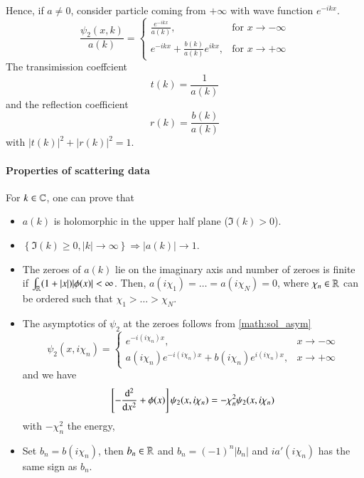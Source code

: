 Hence, if $a\neq 0$, consider particle coming from $+\infty$ with wave function $e^{-ikx}$. 
\begin{equation}
	\frac{\psi_2(x,k)}{a(k)} = 
	\begin{cases}
		\frac{e^{-ikx}}{a(k)}, & \text{for } x \rightarrow - \infty \\
		e^{-ikx} + \frac{b(k)}{a(k)} e^{ikx}, & \text{for } x \rightarrow + \infty
	\end{cases}
	\label{math:sol_asym}
\end{equation}
The transimission coeffcient 
\begin{equation*}
	t(k) = \frac{1}{a(k)}
\end{equation*}
and the reflection coefficient
\begin{equation*}
	r(k) = \frac{b(k)}{a(k)}
\end{equation*}
with $|t(k)|^2 + |r(k)|^2 = 1$.

\paragraph{Properties of scattering data}
For $k \in \mathbb{C}$, one can prove that 
\begin{itemize}
	\item $a(k)$ is holomorphic in the upper half plane ($\Im(k) > 0$).
	\item $\left\{\Im(k) \geq 0, |k| \rightarrow \infty \right\} \Rightarrow  |a(k)| \rightarrow 1$.
	\item The zeroes of $a(k)$ lie on the imaginary axis and number of zeroes is finite if $\int_{\mathbb{R}} (1+|x|)|\phi(x)| < \infty$. Then, $a(i \chi_1) = \dots = a(i\chi_N)  = 0$, where $\chi_n \in \mathbb{R}$ can be ordered such that $ \chi_1 > \dots > \chi_N$.
	\item The asymptotics of $\psi_2$ at the zeroes follows from \eqref{math:sol_asym}
		\begin{equation*}
			\psi_2(x, i \chi_n) = 
			\begin{cases}
				e^{-i(i\chi_n)x}, & x \rightarrow -\infty \\
				a(i\chi_n) e^{-i(i\chi_n)x} + b(i\chi_n) e^{i(i\chi_n)x}, & x \rightarrow + \infty
			\end{cases}
		\end{equation*}
		and we have 
		\begin{equation*}
			\left[ -\dv[2]{x} + \phi(x)  \right] \psi_2(x, i\chi_n) = -\chi^2_n \psi_2 (x, i\chi_n)
		\end{equation*}
		with $-\chi_n^2$ the energy,
	\item Set $b_n = b(i\chi_n)$, then $b_n \in \mathbb{R}$ and $b_n = (-1)^n |b_n|$ and $i a'(i\chi_n)$ has the same sign as $b_n$.
\end{itemize}

